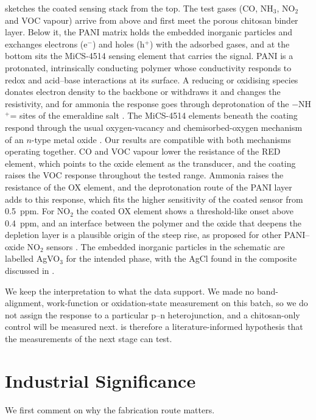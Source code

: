 \documentclass[preprint,11pt]{elsarticle}
\begin{document}
 sketches the coated sensing stack from the top. The test gases (CO, NH$_3$, NO$_2$ and VOC vapour) arrive from above and first meet the porous chitosan binder layer. Below it, the PANI matrix holds the embedded inorganic particles and exchanges electrons (e$^{-}$) and holes (h$^{+}$) with the adsorbed gases, and at the bottom sits the MiCS-4514 sensing element that carries the signal. PANI is a protonated, intrinsically conducting polymer whose conductivity responds to redox and acid--base interactions at its surface. A reducing or oxidising species donates electron density to the backbone or withdraws it and changes the resistivity, and for ammonia the response goes through deprotonation of the $-$NH$^{+}$= sites of the emeraldine salt \cite{yang2023panisensors}. The MiCS-4514 elements beneath the coating respond through the usual oxygen-vacancy and chemisorbed-oxygen mechanism of an $n$-type metal oxide \cite{fine2010mox}. Our results are compatible with both mechanisms operating together. CO and VOC vapour lower the resistance of the RED element, which points to the oxide element as the transducer, and the coating raises the VOC response throughout the tested range. Ammonia raises the resistance of the OX element, and the deprotonation route of the PANI layer adds to this response, which fits the higher sensitivity of the coated sensor from 0.5~ppm. For NO$_2$ the coated OX element shows a threshold-like onset above 0.4~ppm, and an interface between the polymer and the oxide that deepens the depletion layer is a plausible origin of the steep rise, as proposed for other PANI--oxide NO$_2$ sensors \cite{bonyani2022auzno}. The embedded inorganic particles in the schematic are labelled AgVO$_3$ for the intended phase, with the AgCl found in the composite discussed in .

We keep the interpretation to what the data support. We made no band-alignment, work-function or oxidation-state measurement on this batch, so we do not assign the response to a particular p--n heterojunction, and a chitosan-only control will be measured next.  is therefore a literature-informed hypothesis that the measurements of the next stage can test.

\FloatBarrier
\section{Industrial Significance}
\label{sec:industrial}
We first comment on why the fabrication route matters.
\end{document}
